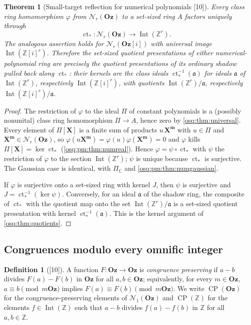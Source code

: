 \documentclass[11pt,letterpaper]{article}
\numberwithin{equation}{section}
\newtheorem{theorem}{Theorem}[section]
\theoremstyle{definition}
\newtheorem{definition}[definition]{Definition}
\theoremstyle{remark}
\theoremstyle{plain}
\newcommand{\Oz}{\mathbf{Oz}}
\newcommand{\GOz}{\Oz[i]}
\newcommand{\Z}{\mathbb Z}
\newcommand{\C}{\mathbb C}
\newcommand{\ct}{\operatorname{ct}}
\newcommand{\Int}{\operatorname{Int}}
\newcommand{\Num}{\mathscr N}
\newcommand{\CP}{\operatorname{CP}}
\newcommand{\src}[1]{\textup{\textsf{[#1]}}}
\begin{document}
\begin{theorem}[Small-target reflection for numerical polynomials \src{10}]
\label{osq:pm:thm:numreflection}
Every class ring homomorphism $\varphi$ from $\Num_r(\Oz)$ to a set-sized ring $A$
factors uniquely through
\[
 \ct_*:\Num_r(\Oz)\longrightarrow\Int(\Z^r).
\]
The analogous assertion holds for $\Num_r(\GOz)$ with universal image $\Int(\Z[i]^r)$.
Therefore the set-sized quotient presentations of either numerical-polynomial ring are
precisely the quotient presentations of its ordinary shadow pulled back along $\ct_*$:
their kernels are the class ideals $\ct_*^{-1}(\mathfrak a)$ for ideals $\mathfrak a$ of
$\Int(\Z^r)$, respectively $\Int(\Z[i]^r)$, with quotients $\Int(\Z^r)/\mathfrak a$,
respectively $\Int(\Z[i]^r)/\mathfrak a$.
\end{theorem}
\begin{proof}
The restriction of $\varphi$ to the ideal $\Pi$ of constant polynomials is a (possibly
nonunital) class ring homomorphism $\Pi\to A$, hence zero by \cref{osq:thm:universal}.
Every element of $\Pi[\mathbf X]$ is a finite sum of products $u\,\mathbf X^{\mathbf m}$
with $u\in\Pi$ and $\mathbf X^{\mathbf m}\in\Num_r(\Oz)$, so
$\varphi(u\mathbf X^{\mathbf m})=\varphi(u)\varphi(\mathbf X^{\mathbf m})=0$ and $\varphi$
kills $\Pi[\mathbf X]=\ker\ct_*$ (\cref{osq:pm:thm:numreal}). Hence
$\varphi=\psi\circ\ct_*$ with $\psi$ the restriction of $\varphi$ to the section
$\Int(\Z^r)$; $\psi$ is unique because $\ct_*$ is surjective. The Gaussian case is
identical, with $\Pi_\C$ and \cref{osq:pm:thm:numgaussian}.

If $\varphi$ is surjective onto a set-sized ring with kernel $J$, then $\psi$ is surjective
and $J=\ct_*^{-1}(\ker\psi)$. Conversely, for an ideal $\mathfrak a$ of the shadow ring,
the composite of $\ct_*$ with the quotient map onto the set $\Int(\Z^r)/\mathfrak a$ is a
set-sized quotient presentation with kernel $\ct_*^{-1}(\mathfrak a)$. This is the
kernel argument of \cref{osq:thm:quotients}.
\end{proof}

\subsection{Congruences modulo every omnific integer}\label{osq:pm:sub:congruence}

\begin{definition}[\src{10}]\label{osq:pm:def:cp}
A function $F:\Oz\to\Oz$ is \emph{congruence preserving} if $a-b$ divides $F(a)-F(b)$ in
$\Oz$ for all $a,b\in\Oz$; equivalently, for every $m\in\Oz$, $a\equiv b\pmod{m\Oz}$
implies $F(a)\equiv F(b)\pmod{m\Oz}$. We write $\CP(\Oz)$ for the congruence-preserving
elements of $\Num_1(\Oz)$ and $\CP(\Z)$ for the elements $f\in\Int(\Z)$ such that $a-b$
divides $f(a)-f(b)$ in $\Z$ for all $a,b\in\Z$.
\end{definition}
\end{document}
